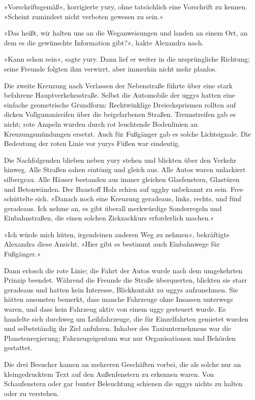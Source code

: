 »Vorschriftsgemäß«, korrigierte yury, ohne tatsächlich eine Vorschrift zu kennen. »Scheint zumindest nicht verboten gewesen zu sein.«

»Das heißt, wir halten uns an die Weganweisungen und landen an einem Ort, an dem es die gewünschte Information gibt?«, hakte Alexandra nach.

»Kann schon sein«, sagte yury. Dann lief er weiter in die ursprüngliche Richtung; seine Freunde folgten ihm verwirrt, aber immerhin nicht mehr planlos.

Die zweite Kreuzung nach Verlassen der Nebenstraße führte über eine stark befahrene Hauptverkehrsstraße. Selbst die Automobile der uggys hatten eine einfache geometrische Grundform: Rechtwinklige Dreiecksprismen rollten auf dicken Vollgummireifen über die beigefarbenen Straßen. Trennstreifen gab es nicht; rote Ampeln wurden durch rot leuchtende Bodenlinien an Kreuzungsmündungen ersetzt. Auch für Fußgänger gab es solche Lichtsignale. Die Bedeutung der roten Linie vor yurys Füßen war eindeutig.

Die Nachfolgenden blieben neben yury stehen und blickten über den Verkehr hinweg. Alle Straßen sahen eintönig und gleich aus. Alle Autos waren unlackiert silbergrau. Alle Häuser bestanden aus immer gleichen Glasfenstern, Glastüren und Betonwänden. Der Baustoff Holz schien auf ugghy unbekannt zu sein. Free schüttelte sich. »Danach noch eine Kreuzung geradeaus, links, rechts, und fünf geradeaus. Ich nehme an, es gibt überall merkwürdige Sonderregeln und Einbahnstraßen, die einen solchen Zickzackkurs erforderlich machen.«

»Ich würde mich hüten, irgendeinen anderen Weg zu nehmen«, bekräftigte Alexandra diese Ansicht. »Hier gibt es bestimmt auch Einbahnwege für Fußgänger.«

Dann erlosch die rote Linie; die Fahrt der Autos wurde nach dem umgekehrten Prinzip beendet. Während die Freunde die Straße überquerten, blickten sie starr geradeaus und hatten kein Interesse, Blickkontakt zu uggys aufzunehmen. Sie hätten ansonsten bemerkt, dass manche Fahrzeuge ohne Insassen unterwegs waren, und dass kein Fahrzeug aktiv von einem uggy gesteuert wurde. Es handelte sich durchweg um Leihfahrzeuge, die für Einzelfahrten gemietet wurden und selbstständig ihr Ziel anfuhren. Inhaber des Taxiunternehmens war die Planetenregierung; Fahrzeugeigentum war nur Organisationen und Behörden gestattet.

Die drei Besucher kamen an mehreren Geschäften vorbei, die als solche nur an kleingedrucktem Text auf den Außenfenstern zu erkennen waren. Von Schaufenstern oder gar bunter Beleuchtung schienen die uggys nichts zu halten oder zu verstehen.

